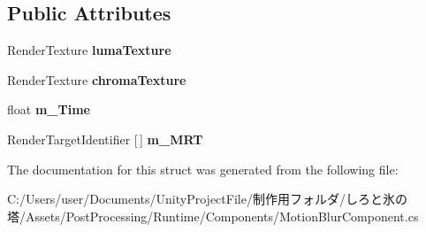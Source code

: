 \subsection*{Public Attributes}
\begin{DoxyCompactItemize}
\item 
\mbox{\label{struct_unity_engine_1_1_post_processing_1_1_motion_blur_component_1_1_frame_blending_filter_1_1_frame_a7e96e52b4d104039aafc3545589d5f73}} 
Render\+Texture {\bfseries luma\+Texture}
\item 
\mbox{\label{struct_unity_engine_1_1_post_processing_1_1_motion_blur_component_1_1_frame_blending_filter_1_1_frame_a5e509a40892dc903d548adc2d17d1b90}} 
Render\+Texture {\bfseries chroma\+Texture}
\item 
\mbox{\label{struct_unity_engine_1_1_post_processing_1_1_motion_blur_component_1_1_frame_blending_filter_1_1_frame_a5cba2ae57fc59a8438d9bbdcabedca1d}} 
float {\bfseries m\+\_\+\+Time}
\item 
\mbox{\label{struct_unity_engine_1_1_post_processing_1_1_motion_blur_component_1_1_frame_blending_filter_1_1_frame_af58428ff9489cd2d1a87700f6800718f}} 
Render\+Target\+Identifier \mbox{[}$\,$\mbox{]} {\bfseries m\+\_\+\+M\+RT}
\end{DoxyCompactItemize}


The documentation for this struct was generated from the following file\+:\begin{DoxyCompactItemize}
\item 
C\+:/\+Users/user/\+Documents/\+Unity\+Project\+File/制作用フォルダ/しろと氷の塔/\+Assets/\+Post\+Processing/\+Runtime/\+Components/Motion\+Blur\+Component.\+cs\end{DoxyCompactItemize}
